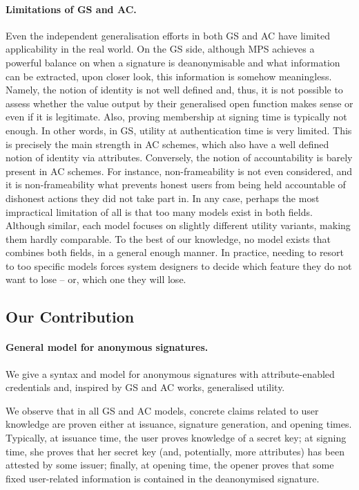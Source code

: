 \paragraph{Limitations of GS and AC.} %
Even the independent generalisation efforts in both GS and AC
have limited applicability in the real world. On the GS side, although MPS
achieves a powerful balance on when a signature is deanonymisable and what
information can be extracted, upon closer look, this information is somehow
meaningless. Namely, the notion of identity is not well defined and, thus, it is
not possible to assess whether the value output by their generalised open
function makes sense or even if it is legitimate. Also, proving membership at
signing time is typically not enough. In other words, in GS,
utility at authentication time is very limited. This is precisely the main
strength in AC schemes, which also have a well defined notion of identity via
attributes. Conversely, the notion of accountability  is barely present in AC
schemes. For instance, non-frameability is not even considered, and it is
non-frameability what prevents honest users from being held accountable of
dishonest actions they did not take part in.
%
In any case, perhaps the most impractical limitation of all is that too many
models exist in both fields. Although similar, each model focuses on slightly
different utility variants, making them hardly comparable. To the best of our
knowledge, no model exists that combines both fields, in a general enough
manner. In practice, needing to resort to too specific models forces system
designers to decide which feature they do not want to lose -- or, which one they
will lose.

\subsection{Our Contribution} 

\paragraph{General model for anonymous signatures.} %
We give a syntax and model for anonymous signatures with attribute-enabled
credentials and, inspired by GS and AC works, generalised utility.

We observe that in all GS and AC models, concrete
claims related to user knowledge are proven either at issuance, signature
generation, and opening times. Typically, at issuance time, the user proves
knowledge of a secret key; at signing time, she proves that her secret key (and,
potentially, more attributes) has been attested by some issuer; finally, at
opening time, the opener proves that some fixed user-related information is
contained in the deanonymised signature.

